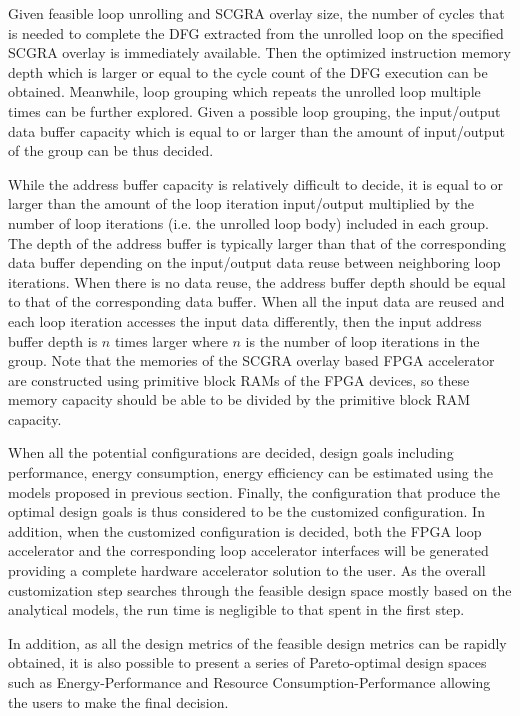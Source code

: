 Given feasible loop unrolling and SCGRA overlay size, the number of cycles that is needed to complete the DFG extracted from the unrolled loop on the specified SCGRA overlay is immediately available. Then the optimized instruction memory depth which is larger or equal to the cycle count of the DFG execution can be obtained. Meanwhile, loop grouping which repeats the unrolled loop multiple times can be further explored. Given a possible loop grouping, the input/output data buffer capacity which is equal to or larger than the amount of input/output of the group can be thus decided. 

While the address buffer capacity is relatively difficult to decide, it is equal to or larger than the amount of the loop iteration input/output multiplied by the number of loop iterations (i.e. the unrolled loop body) included in each group. The depth of the address buffer is typically larger than that of the corresponding data buffer depending on the input/output data reuse between neighboring loop iterations. When there is no data reuse, the address buffer depth should be equal to that of the corresponding data buffer. When all the input data are reused and each loop iteration accesses the input data differently, then the input address buffer depth is $n$ times larger where $n$ is the number of loop iterations in the group. Note that the memories of the SCGRA overlay based FPGA accelerator are constructed using primitive block RAMs of the FPGA devices, so these memory capacity should be able to be divided by the primitive block RAM capacity. 

When all the potential configurations are decided, design goals including performance, energy consumption, energy efficiency can be estimated using the models proposed in previous section. Finally, the configuration that produce the optimal design goals is thus considered to be the customized configuration. In addition, when the customized configuration is decided, both the FPGA loop accelerator and the corresponding loop accelerator interfaces will be generated providing a complete hardware accelerator solution to the user. As the overall customization step searches through the feasible design space mostly based on the analytical models, the run time is negligible to that spent in the first step.

In addition, as all the design metrics of the feasible design metrics can be rapidly obtained, it is also possible to present a series of Pareto-optimal design spaces such as Energy-Performance and Resource Consumption-Performance allowing the users to make the final decision. 

